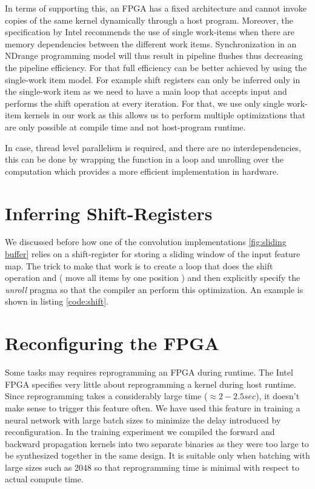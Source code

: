In terms of supporting this, an FPGA has a fixed architecture and cannot invoke copies of the same kernel dynamically through a host program. Moreover, the specification by Intel recommends the use of single work-items when there are memory dependencies between the different work items. Synchronization in an NDrange programming model will thus result in pipeline flushes thus decreasing the pipeline efficiency. For that full efficiency can be better achieved by using the single-work item model. For example shift registers can only be inferred only in the single-work item as we need to have a main loop that accepts input and performs the shift operation at every iteration. For that, we use only single work-item kernels in our work as this allows us to perform multiple optimizations that are only possible at compile time and not host-program runtime. 

In case, thread level parallelism is required, and there are no interdependencies, this can be done by wrapping the function in a loop and unrolling over the computation which provides a more efficient implementation in hardware. 

\section{Inferring Shift-Registers} \label{shiftinf}

We discussed before how one of the convolution implementations \ref{fig:sliding buffer} relies on a shift-register for storing a sliding window of the input feature map. The trick to make that work is to create a loop that does the shift operation and ( move all items by one position ) and then explicitly specify the \emph{unroll} pragma so that the compiler an perform this optimization. An example is shown in listing \ref{code:shift}.

 \label{code:shift} 

\section{Reconfiguring the FPGA}

Some tasks may requires reprogramming an FPGA during runtime. The Intel FPGA specifies very little about reprogramming a kernel during host runtime. Since reprogramming takes a considerably large time ($\approx 2 - 2.5 sec $), it doesn’t make sense to trigger this feature often. We have used this feature in training a neural network with large batch sizes to minimize the delay introduced by reconfiguration. In the training experiment we compiled the forward and backward propagation kernels into two separate binaries as they were too large to be synthesized together in the same design. It is suitable only when batching with large sizes such as 2048 so that reprogramming time is minimal with respect to actual compute time. 

